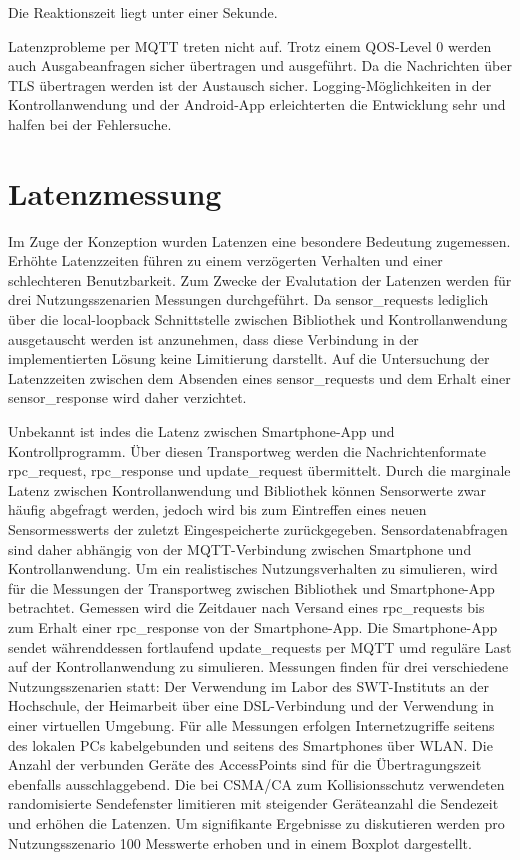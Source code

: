 \documentclass[11pt,a4paper]{report}
\begin{document}
Die Reaktionszeit liegt unter einer Sekunde.

Latenzprobleme per MQTT treten nicht auf.
Trotz einem QOS-Level 0 werden auch Ausgabeanfragen sicher übertragen und ausgeführt.
Da die Nachrichten über TLS übertragen werden ist der Austausch sicher.
Logging-Möglichkeiten in der Kontrollanwendung und der Android-App erleichterten die Entwicklung sehr und halfen bei der Fehlersuche.


\section{Latenzmessung}
Im Zuge der Konzeption wurden Latenzen eine besondere Bedeutung zugemessen.
Erhöhte Latenzzeiten führen zu einem verzögerten Verhalten und einer schlechteren Benutzbarkeit.
Zum Zwecke der Evalutation der Latenzen werden für drei Nutzungsszenarien Messungen durchgeführt.
Da sensor\_requests lediglich über die local-loopback Schnittstelle zwischen Bibliothek und Kontrollanwendung ausgetauscht werden ist anzunehmen, dass diese Verbindung in der implementierten Lösung keine Limitierung darstellt.
Auf die Untersuchung der Latenzzeiten zwischen dem Absenden eines sensor\_requests und dem Erhalt einer sensor\_response wird daher verzichtet.

Unbekannt ist indes die Latenz zwischen Smartphone-App und Kontrollprogramm.
Über diesen Transportweg werden die Nachrichtenformate rpc\_request, rpc\_response und update\_request übermittelt.
Durch die marginale Latenz zwischen Kontrollanwendung und Bibliothek können Sensorwerte zwar häufig abgefragt werden, jedoch wird bis zum Eintreffen eines neuen Sensormesswerts der zuletzt Eingespeicherte zurückgegeben.
Sensordatenabfragen sind daher abhängig von der MQTT-Verbindung zwischen Smartphone und Kontrollanwendung.
Um ein realistisches Nutzungsverhalten zu simulieren, wird für die Messungen der Transportweg zwischen Bibliothek und Smartphone-App betrachtet.
Gemessen wird die Zeitdauer nach Versand eines rpc\_requests bis zum Erhalt einer rpc\_response von der Smartphone-App.
Die Smartphone-App sendet währenddessen fortlaufend update\_requests per MQTT umd reguläre Last auf der Kontrollanwendung zu simulieren.
Messungen finden für drei verschiedene Nutzungsszenarien statt: Der Verwendung im Labor des SWT-Instituts an der Hochschule, der Heimarbeit über eine DSL-Verbindung und der Verwendung in einer virtuellen Umgebung.
Für alle Messungen erfolgen Internetzugriffe seitens des lokalen PCs kabelgebunden und seitens des Smartphones über WLAN.
Die Anzahl der verbunden Geräte des AccessPoints sind für die Übertragungszeit ebenfalls ausschlaggebend.
Die bei CSMA/CA zum Kollisionsschutz verwendeten randomisierte Sendefenster limitieren mit steigender Geräteanzahl die Sendezeit und erhöhen die Latenzen.
Um signifikante Ergebnisse zu diskutieren werden pro Nutzungsszenario 100 Messwerte erhoben und in einem Boxplot dargestellt.
\end{document}
